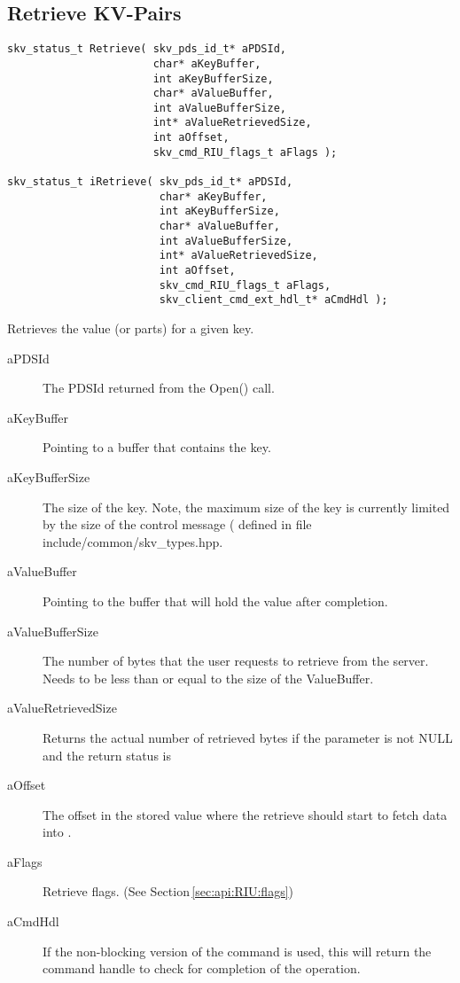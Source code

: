 \subsection{Retrieve KV-Pairs}\label{sec:api:retrieve}
\begin{lstlisting}
skv_status_t Retrieve( skv_pds_id_t* aPDSId,
                       char* aKeyBuffer,
                       int aKeyBufferSize,
                       char* aValueBuffer,
                       int aValueBufferSize,
                       int* aValueRetrievedSize,
                       int aOffset,
                       skv_cmd_RIU_flags_t aFlags );

skv_status_t iRetrieve( skv_pds_id_t* aPDSId,
                        char* aKeyBuffer,
                        int aKeyBufferSize,
                        char* aValueBuffer,
                        int aValueBufferSize,
                        int* aValueRetrievedSize,
                        int aOffset,
                        skv_cmd_RIU_flags_t aFlags,
                        skv_client_cmd_ext_hdl_t* aCmdHdl );
\end{lstlisting}
Retrieves the value (or parts) for a given key.
\begin{description}
\item[aPDSId] The PDSId returned from the Open() call.
\item[aKeyBuffer] Pointing to a buffer that contains the key.
\item[aKeyBufferSize] The size of the key.  Note, the maximum size of
  the key is currently limited by the size of the control message
  ( defined in file
  include/common/skv\_types.hpp.
\item[aValueBuffer] Pointing to the buffer that will hold the value
  after completion.
\item[aValueBufferSize] The number of bytes that the user requests to
  retrieve from the server.  Needs to be less than or equal to the
  size of the ValueBuffer.
\item[aValueRetrievedSize] Returns the actual number of retrieved
  bytes if the parameter is not NULL and the return status is
\item[aOffset] The offset in the stored value where the retrieve
  should start to fetch data into .
\item[aFlags] Retrieve flags. (See Section\,\ref{sec:api:RIU:flags})
\item[aCmdHdl] If the non-blocking version of the command is used,
  this will return the command handle to check for completion of the
  operation.
\end{description}


